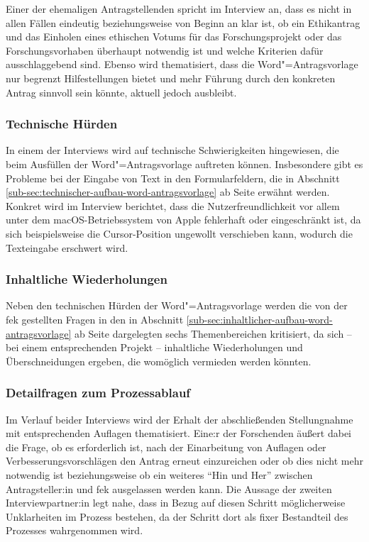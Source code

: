 \documentclass[a4paper,12pt,twoside]{scrreprt}
\begin{document}
Einer der ehemaligen Antragstellenden spricht im Interview an, dass es nicht in allen Fällen eindeutig beziehungsweise von Beginn an klar ist, ob ein Ethikantrag und das Einholen eines ethischen Votums für das Forschungsprojekt oder das Forschungsvorhaben überhaupt notwendig ist und welche Kriterien dafür ausschlaggebend sind. Ebenso wird thematisiert, dass die Word"=Antragsvorlage nur begrenzt Hilfestellungen bietet und mehr Führung durch den konkreten Antrag sinnvoll sein könnte, aktuell jedoch ausbleibt.

\subsubsection*{Technische Hürden}
\label{sub-sub-sec:technische-hürden}

In einem der Interviews wird auf technische Schwierigkeiten hingewiesen, die beim Ausfüllen der Word"=Antragsvorlage auftreten können. Insbesondere gibt es Probleme bei der Eingabe von Text in den Formularfeldern, die in Abschnitt \ref{sub-sec:technischer-aufbau-word-antragsvorlage} ab Seite \pageref{sub-sec:technischer-aufbau-word-antragsvorlage} erwähnt werden. Konkret wird im Interview berichtet, dass die Nutzerfreundlichkeit vor allem unter dem macOS-Betriebssystem von Apple fehlerhaft oder eingeschränkt ist, da sich beispielsweise die Cursor-Position ungewollt verschieben kann, wodurch die Texteingabe erschwert wird.

\subsubsection*{Inhaltliche Wiederholungen}
\label{sub-sub-sec:inhaltliche-wiederholungen}

Neben den technischen Hürden der Word"=Antragsvorlage werden die von der \ac{fek} gestellten Fragen in den in Abschnitt \ref{sub-sec:inhaltlicher-aufbau-word-antragsvorlage} ab Seite \pageref{sub-sec:inhaltlicher-aufbau-word-antragsvorlage} dargelegten sechs Themenbereichen kritisiert, da sich -- bei einem entsprechenden Projekt -- inhaltliche Wiederholungen und Überschneidungen ergeben, die womöglich vermieden werden könnten.

\subsubsection*{Detailfragen zum Prozessablauf}
\label{sub-sub-sec:detailfragen-prozessablauf}

Im Verlauf beider Interviews wird der Erhalt der abschließenden Stellungnahme mit entsprechenden Auflagen thematisiert. Eine:r der Forschenden äußert dabei die Frage, ob es erforderlich ist, nach der Einarbeitung von Auflagen oder Verbesserungsvorschlägen den Antrag erneut einzureichen oder ob dies nicht mehr notwendig ist beziehungsweise ob ein weiteres \enquote{Hin und Her} zwischen Antragsteller:in und \ac{fek} ausgelassen werden kann. Die Aussage der zweiten Interviewpartner:in legt nahe, dass in Bezug auf diesen Schritt möglicherweise Unklarheiten im Prozess bestehen, da der Schritt dort als fixer Bestandteil des Prozesses wahrgenommen wird.
\end{document}
